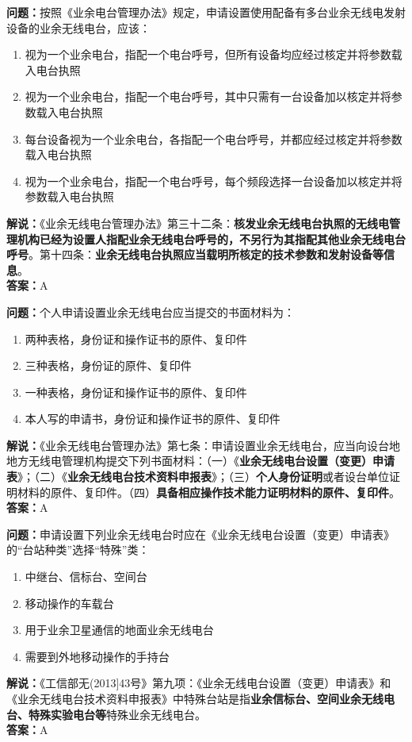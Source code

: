 \textbf{问题：}按照《业余电台管理办法》规定，申请设置使用配备有多台业余无线电发射设备的业余无线电台，应该：
\begin{enumerate}[label=\Alph*), leftmargin=1cm]
	\item 视为一个业余电台，指配一个电台呼号，但所有设备均应经过核定并将参数载入电台执照
	\item 视为一个业余电台，指配一个电台呼号，其中只需有一台设备加以核定并将参数载入电台执照
	\item 每台设备视为一个业余电台，各指配一个电台呼号，并都应经过核定并将参数载入电台执照
	\item 视为一个业余电台，指配一个电台呼号，每个频段选择一台设备加以核定并将参数载入电台执照
\end{enumerate}
\textbf{解说：}《业余无线电台管理办法》第三十二条：\textbf{核发业余无线电台执照的无线电管理机构已经为设置人指配业余无线电台呼号的，不另行为其指配其他业余无线电台呼号}。第十四条：\textbf{业余无线电台执照应当载明所核定的技术参数和发射设备等信息}。\\\textbf{答案：}A

\textbf{问题：}个人申请设置业余无线电台应当提交的书面材料为：
\begin{enumerate}[label=\Alph*), leftmargin=1cm]
	\item 两种表格，身份证和操作证书的原件、复印件
	\item 三种表格，身份证的原件、复印件
	\item 一种表格，身份证和操作证书的原件、复印件
	\item 本人写的申请书，身份证和操作证书的原件、复印件
\end{enumerate}
\textbf{解说：}《业余无线电台管理办法》第七条：申请设置业余无线电台，应当向设台地地方无线电管理机构提交下列书面材料：（一）《\textbf{业余无线电台设置（变更）申请表}》；（二）《\textbf{业余无线电台技术资料申报表}》；（三）\textbf{个人身份证明}或者设台单位证明材料的原件、复印件。（四）\textbf{具备相应操作技术能力证明材料的原件、复印件}。\\\textbf{答案：}A

\textbf{问题：}申请设置下列业余无线电台时应在《业余无线电台设置（变更）申请表》 的“台站种类”选择“特殊”类：
\begin{enumerate}[label=\Alph*), leftmargin=1cm]
	\item 中继台、信标台、空间台
	\item 移动操作的车载台
	\item 用于业余卫星通信的地面业余无线电台
	\item 需要到外地移动操作的手持台
\end{enumerate}
\textbf{解说：}《工信部无(2013]43号》第九项：《业余无线电台设置（变更）申请表》和《业余无线电台技术资料申报表》中特殊台站是指\textbf{业余信标台、空间业余无线电台、特殊实验电台等}特殊业余无线电台。\\\textbf{答案：}A

